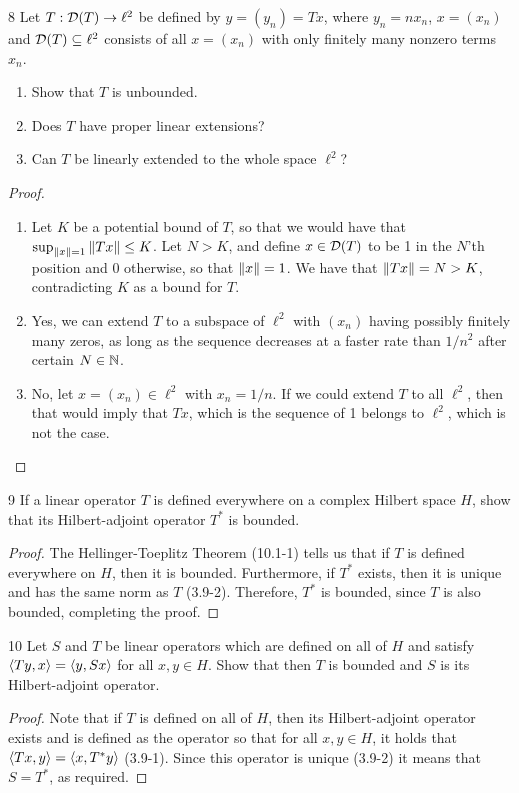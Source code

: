 \begin{exercise}{8}
Let $T: \mathcal{D}(T) \to \ell^2$ be defined by $y = (y_n) = T x$, where $y_n = n x_n$, $x = (x_n)$ and $\mathcal{D}(T) \subseteq \ell^2$ consists of all $x = (x_n)$ with only finitely many nonzero terms $x_n$.
\begin{enumerate}
    \item Show that $T$ is unbounded.
    \item Does $T$ have proper linear extensions?
    \item Can $T$ be linearly extended to the whole space $\ell^2$?
\end{enumerate}
\end{exercise}
\begin{proof}
\begin{enumerate}
    \item Let $K$ be a potential bound of $T$, so that we would have that $\sup_{\left\lVert x\right\rVert=1} \left\lVert Tx\right\rVert \leq K$.
    Let $N > K$, and define $x \in \mathcal{D}(T)$ to be 1 in the $N$'th position and 0 otherwise, so that $\left\lVert x\right\rVert = 1$.
    We have that $\left\lVert Tx\right\rVert = N > K$, contradicting $K$ as a bound for $T$.
    \item Yes, we can extend $T$ to a subspace of $\ell^2$ with $(x_n)$ having possibly finitely many zeros, as long as the sequence decreases at a faster rate than $1/n^2$ after certain $N \in \mathbb{N}$.
    \item No, let $x = (x_n) \in \ell^2$ with $x_n = 1/n$. 
    If we could extend $T$ to all $\ell^2$, then that would imply that $Tx$, which is the sequence of 1 belongs to $\ell^2$, which is not the case.
\end{enumerate}
\end{proof} 

\begin{exercise}{9}
If a linear operator $T$ is defined everywhere on a complex Hilbert space $H$, show that its Hilbert-adjoint operator $T^\ast$ is bounded.
\end{exercise}
\begin{proof}
The Hellinger-Toeplitz Theorem (10.1-1) tells us that if $T$ is defined everywhere on $H$, then it is bounded.
Furthermore, if $T^\ast$ exists, then it is unique and has the same norm as $T$ (3.9-2).
Therefore, $T^\ast$ is bounded, since $T$ is also bounded, completing the proof.
\end{proof} 

\begin{exercise}{10}
Let $S$ and $T$ be linear operators which are defined on all of $H$ and satisfy $\langle Ty, x\rangle = \langle y, Sx\rangle$ for all $x, y \in H$.
Show that then $T$ is bounded and $S$ is its Hilbert-adjoint operator.
\end{exercise}
\begin{proof}
Note that if $T$ is defined on all of $H$, then its Hilbert-adjoint operator exists and is defined as the operator so that for all $x, y \in H$, it holds that $\langle Tx, y\rangle = \langle x, T^\ast y\rangle$ (3.9-1).
Since this operator is unique (3.9-2) it means that $S = T^\ast$, as required.
\end{proof} 
